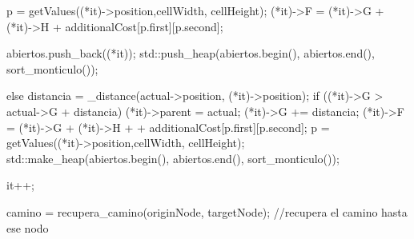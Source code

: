 {{{{{{                        p = getValues((*it)->position,cellWidth, cellHeight);
                        (*it)->F = (*it)->G + (*it)->H + additionalCost[p.first][p.second];
                        
                        abiertos.push_back((*it));
                        std::push_heap(abiertos.begin(), abiertos.end(), sort_monticulo());   
                    }
                    else
                    {
                        distancia = _distance(actual->position, (*it)->position);
                        if ((*it)->G > actual->G + distancia)
                        {
                            (*it)->parent = actual;
                            (*it)->G += distancia;
                            (*it)->F = (*it)->G + (*it)->H + + additionalCost[p.first][p.second];
                            p = getValues((*it)->position,cellWidth, cellHeight);
                            std::make_heap(abiertos.begin(), abiertos.end(), sort_monticulo());
                        }
                    }
                }
                it++;
            }
        }
    }
    camino = recupera_camino(originNode, targetNode); //recupera el camino hasta ese nodo
}